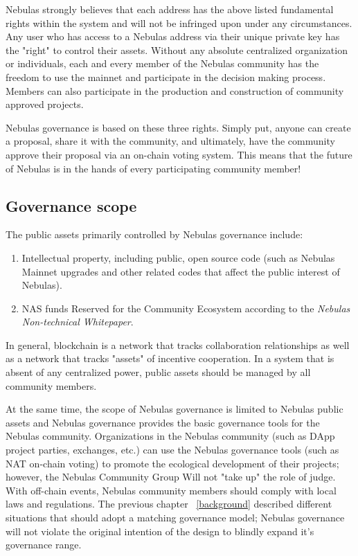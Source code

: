 Nebulas strongly believes that each address has the above listed fundamental rights within the system and will not be infringed upon under any circumstances. Any user who has access to a Nebulas address via their unique private key has the "right" to control their assets. Without any absolute centralized organization or individuals, each and every member of the Nebulas community has the freedom to use the mainnet and participate in the decision making process. Members can also participate in the production and construction of community approved projects. 

Nebulas governance is based on these three rights. Simply put, anyone can create a proposal, share it with the community, and ultimately, have the community approve their proposal via an on-chain voting system. This means that the future of Nebulas is in the hands of every participating community member!

\subsection{Governance scope}


The public assets primarily controlled by Nebulas governance include:

\begin{enumerate}
	\item Intellectual property, including public, open source code (such as Nebulas Mainnet upgrades and other related codes that affect the public interest of Nebulas).
	\item NAS funds Reserved for the Community Ecosystem according to the \textit{Nebulas Non-technical Whitepaper}.
\end{enumerate}

In general, blockchain is a network that tracks collaboration relationships as well as a network that tracks "assets" of incentive cooperation. In a system that is absent of any centralized power, public assets should be managed by all community members.

At the same time, the scope of Nebulas governance is limited to Nebulas public assets and Nebulas governance provides the basic governance tools for the Nebulas community. Organizations in the Nebulas community (such as DApp project parties, exchanges, etc.) can use the Nebulas governance tools (such as NAT on-chain voting) to promote the ecological development of their projects; however, the Nebulas Community Group Will not "take up" the role of judge. With off-chain events, Nebulas community members should comply with local laws and regulations. The previous chapter ~\ref{background} described different situations that should adopt a matching governance model; Nebulas governance will not violate the original intention of the design to blindly expand it's governance range.

